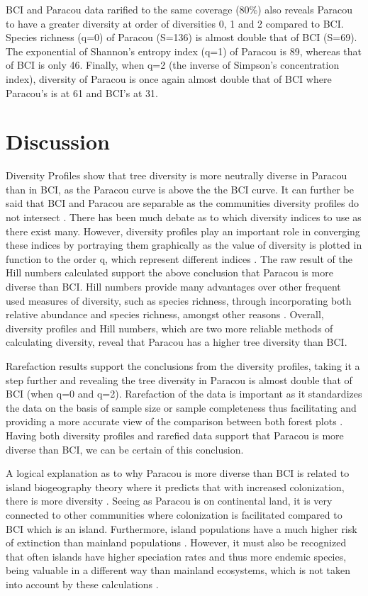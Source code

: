 \documentclass[fleqn,10pt]{ArtEcoFoG} %
\begin{document}
BCI and Paracou data rarified to the same coverage (80\%) also reveals
Paracou to have a greater diversity at order of diversities 0, 1 and 2
compared to BCI. Species richness (q=0) of Paracou (S=136) is almost
double that of BCI (S=69). The exponential of Shannon's entropy index
(q=1) of Paracou is 89, whereas that of BCI is only 46. Finally, when
q=2 (the inverse of Simpson's concentration index), diversity of Paracou
is once again almost double that of BCI where Paracou's is at 61 and
BCI's at 31.

\section{Discussion}\label{discussion}

Diversity Profiles show that tree diversity is more neutrally diverse in
Paracou than in BCI, as the Paracou curve is above the the BCI curve. It
can further be said that BCI and Paracou are separable as the
communities diversity profiles do not intersect
\citep{marcon:cel-01205813}. There has been much debate as to which
diversity indices to use as there exist many. However, diversity
profiles play an important role in converging these indices by
portraying them graphically as the value of diversity is plotted in
function to the order q, which represent different indices
\citep{Tothmeresz1995, marcon:cel-01205813}. The raw result of the Hill
numbers calculated support the above conclusion that Paracou is more
diverse than BCI. Hill numbers provide many advantages over other
frequent used measures of diversity, such as species richness, through
incorporating both relative abundance and species richness, amongst
other reasons \citep{Chao2014}. Overall, diversity profiles and Hill
numbers, which are two more reliable methods of calculating diversity,
reveal that Paracou has a higher tree diversity than BCI.

Rarefaction results support the conclusions from the diversity profiles,
taking it a step further and revealing the tree diversity in Paracou is
almost double that of BCI (when q=0 and q=2). Rarefaction of the data is
important as it standardizes the data on the basis of sample size or
sample completeness thus facilitating and providing a more accurate view
of the comparison between both forest plots \citep{Chao2014}. Having
both diversity profiles and rarefied data support that Paracou is more
diverse than BCI, we can be certain of this conclusion.

A logical explanation as to why Paracou is more diverse than BCI is
related to island biogeography theory where it predicts that with
increased colonization, there is more diversity \citep{BRV:BRV510}.
Seeing as Paracou is on continental land, it is very connected to other
communities where colonization is facilitated compared to BCI which is
an island. Furthermore, island populations have a much higher risk of
extinction than mainland populations \citep{Frankham1997}. However, it
must also be recognized that often islands have higher speciation rates
and thus more endemic species, being valuable in a different way than
mainland ecosystems, which is not taken into account by these
calculations \citep{Kier9322}.
\end{document}
